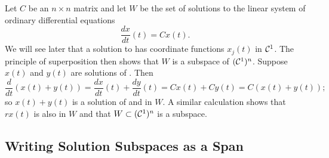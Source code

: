 \documentclass{ximera}
\begin{document}
Let $C$ be an $n\times n$ matrix and let $W$ be the set of solutions to
the linear system of ordinary differential equations
\begin{equation} \label{Cx(t)}
\frac{dx}{dt}(t) = Cx(t).
\end{equation}
We will see later that a solution to  has coordinate
functions $x_j(t)$ in ${\cal C}^1$.  The principle of superposition
then shows that $W$ is a subspace of $({\cal C}^1)^n$.  Suppose
$x(t)$ and $y(t)$ are solutions of .  Then
\[
\frac{d}{dt}(x(t)+y(t)) = \frac{dx}{dt}(t) + \frac{dy}{dt}(t) =
Cx(t) + Cy(t) = C(x(t)+y(t));
\]
so $x(t)+y(t)$ is a solution of  and in $W$.  A
similar calculation shows that $rx(t)$ is also in $W$ and
that $W\subset({\cal C}^1)^n$ is a subspace.


\subsection*{Writing Solution Subspaces as a Span}
\end{document}
